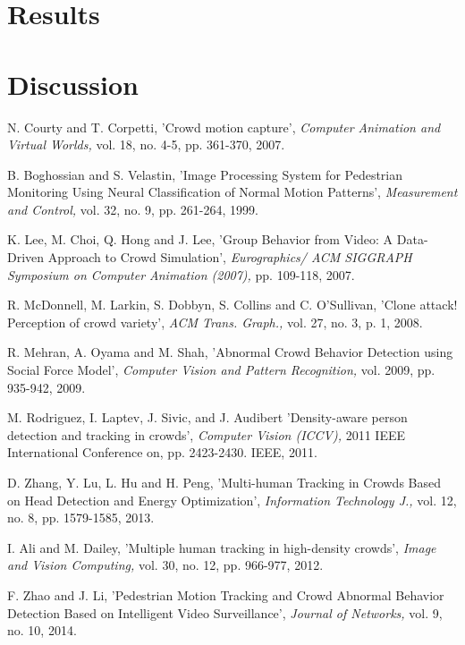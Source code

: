 \documentclass[conference]{IEEEtran}
\begin{document}
\section{Results}

\section{Discussion}

\begin{thebibliography}{1}

N. Courty and T. Corpetti, 'Crowd motion capture', \textit{Computer Animation and Virtual Worlds,} vol. 18, no. 4-5, pp. 361-370, 2007.

B. Boghossian and S. Velastin, 'Image Processing System for Pedestrian Monitoring Using Neural Classification of Normal Motion Patterns', \textit{Measurement and Control,} vol. 32, no. 9, pp. 261-264, 1999.

K. Lee, M. Choi, Q. Hong and J. Lee, 'Group Behavior from Video: A Data-Driven Approach to Crowd Simulation', \textit{Eurographics/ ACM SIGGRAPH Symposium on Computer Animation (2007),} pp. 109-118, 2007.

R. McDonnell, M. Larkin, S. Dobbyn, S. Collins and C. O'Sullivan, 'Clone attack! Perception of crowd variety', \textit{ACM Trans. Graph.,} vol. 27, no. 3, p. 1, 2008.

R. Mehran, A. Oyama and M. Shah, 'Abnormal Crowd Behavior Detection using Social Force Model', \textit{Computer Vision and Pattern Recognition,} vol. 2009, pp. 935-942, 2009.

M. Rodriguez, I. Laptev, J. Sivic, and J. Audibert 'Density-aware person detection and tracking in crowds', \textit{Computer Vision (ICCV),} 2011 IEEE International Conference on, pp. 2423-2430. IEEE, 2011.

D. Zhang, Y. Lu, L. Hu and H. Peng, 'Multi-human Tracking in Crowds Based on Head Detection and Energy Optimization', \textit{Information Technology J.,} vol. 12, no. 8, pp. 1579-1585, 2013.

I. Ali and M. Dailey, 'Multiple human tracking in high-density crowds', \textit{Image and Vision Computing,} vol. 30, no. 12, pp. 966-977, 2012.

F. Zhao and J. Li, 'Pedestrian Motion Tracking and Crowd Abnormal Behavior Detection Based on Intelligent Video Surveillance', \textit{Journal of Networks,} vol. 9, no. 10, 2014.


\end{thebibliography}
\end{document}
